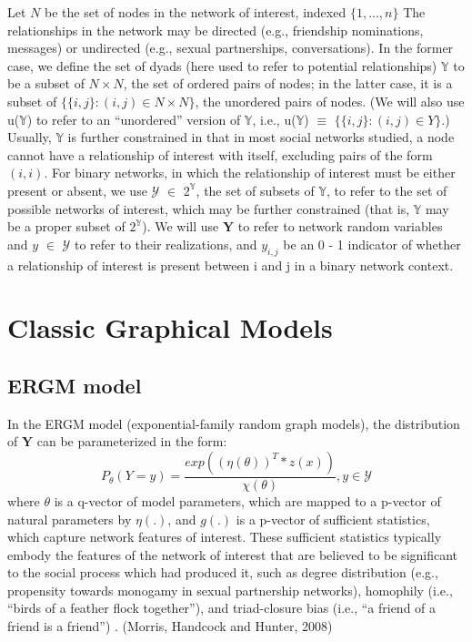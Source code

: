 \documentclass[12pt]{ociamthesis}  %
\begin{document}
	Let $N$ be the set of nodes in the network of interest, indexed $\{ 1,...,n\}$ The relationships in the network may be directed (e.g., friendship nominations, messages) or undirected (e.g., sexual partnerships, conversations). In the former case, we define the set of dyads (here used to refer to potential relationships) $\mathbb{Y}$ to be a subset of $N \times N$, the set of ordered pairs of nodes; in the latter case, it is a subset of $\{ \{i, j\} : (i, j) \in N \times N\}$, the unordered pairs of nodes. (We will also use u($\mathbb{Y}$) to refer to an “unordered” version of $\mathbb{Y}$, i.e., u($\mathbb{Y}$) $\equiv$ $\{\{i, j\} : (i, j) \in Y \}$.) Usually, $\mathbb{Y}$ is further constrained in that in most social networks studied, a node cannot have a relationship of interest with itself, excluding pairs of the form $(i, i)$. For binary networks, in which the relationship of interest must be either present or absent, we use $\mathcal{Y}$ $\in$ $2^{\mathbb{Y}}$, the set of subsets of $\mathbb{Y}$, to refer to the set of possible networks of interest, which may be further constrained (that is, $\mathbb{Y}$ may be a proper subset of $2^{\mathbb{Y}}$). We will use $\textbf{Y}$ to refer to network random variables and $y$ $\in$ $\mathcal{Y}$ to refer to their realizations, and $y_{i,j}$ be an 0 - 1 indicator of whether a relationship of interest is present between i and j in a binary network context.
	
	\section{Classic Graphical Models}
	
	\subsection{ERGM model}
	In the ERGM model (exponential-family random graph models), the distribution of $\textbf{Y}$ can be parameterized in the form:
	\begin{equation}
	P_{\theta}(Y = y) = \frac{exp((\eta(\theta)) ^{T}*z(x))}{\chi(\theta)}, y \in \mathcal{Y}
	\end{equation}
	where $\theta$ is a q-vector of model parameters, which are mapped to a p-vector of natural parameters by $\eta(.)$, and $g(.)$ is a p-vector of sufficient statistics, which capture network features of interest. These sufficient statistics typically embody the features of the network of interest that are believed to be significant to the social process which had produced it, such as degree distribution (e.g., propensity towards monogamy in sexual partnership networks), homophily (i.e., “birds of a feather flock together”), and triad-closure bias (i.e., “a friend of a friend is a friend”) . (Morris, Handcock and Hunter, 2008)
	
\end{document}
